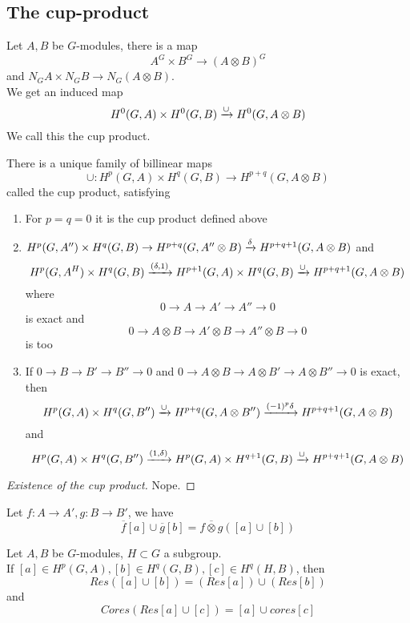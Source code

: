 \documentclass[../main.tex]{subfiles}
\begin{document}
\subsection{The cup-product}
Let $A,B$ be $G$-modules, there is a map
\[ 
A^{G}\times B^{G}\to ( A\otimes B) ^{G}
\]
and $N_G A\times N_G B\to N_G( A\otimes B) $.\\
We get an induced map 
\[ 
	H^{0}( G,A) \times H^{0}( G,B) \xrightarrow{\cup} H^{0}( G,A\otimes B) 
\]
We call this the cup product.
\begin{defn}
	There is a unique family of billinear maps 
	\[ 
	\cup:H^{p}( G,A) \times H^{q}( G,B) \to H^{p+q}( G,A\otimes B) 
	\]
called the cup product, satisfying
\begin{enumerate}
\item For $p=q=0$ it is the cup product defined above
\item $H^{p}( G,A'') \times H^{q}( G,B) \to H^{p+q}( G, A''\otimes B) \xrightarrow{\delta} H^{p+q+1}( G,A\otimes B) $ and
	\[ 
		H^{p}( G,A^{H}) \times H^{q}( G,B) \xrightarrow{( \delta,1) } H^{p+1}( G,A) \times H^{q}( G,B) \xrightarrow{\cup} H^{p+q+1}( G,A\otimes B) 	
	\]
	where 
	\[ 
	0\to A \to A' \to A'' \to 0	
	\]
	is exact and
	\[ 
	0 \to A\otimes B \to A'\otimes B \to A''\otimes B \to 0
	\]
	is too

\item If $0 \to B \to B' \to B''\to 0$ and $0 \to A\otimes B \to A\otimes B' \to A \otimes B'' \to 0$ is exact, then
	\[ 
		H^{p}( G,A) \times H^{q}( G,B'') \xrightarrow{\cup} H^{p+q}( G, A \otimes B'') \xrightarrow{ ( -1)^{p}\delta} H^{p+q+1}( G,A\otimes B) 
	\]
	and
	\[ 
		H^{p}( G,A) \times H^{q}( G,B'') \xrightarrow{( 1,\delta) } H^{p }( G,A) \times H^{q+1}( G, B) \xrightarrow{\cup} H^{p+q+1}( G,A\otimes B) 
	\]
\end{enumerate}
\end{defn}
\begin{proof}[Existence of the cup product]
Nope.
\end{proof}
\begin{thm}
	Let $f:A\to A', g:B\to B'$, we have
	\[ 
		\overline{f}[a] \cup \overline{g}[b] = \overline{f\otimes g}( [ a] \cup [ b] ) 
	\]
	
\end{thm}
\begin{thm}
Let $A,B$ be $G$-modules, $H \subset G$ a subgroup.\\
If $[a] \in H^{p}( G,A) , [ b] \in H^{q}( G,B) , [ c] \in H^{q}( H,B) $, then
\[ 
Res(  [ a] \cup [ b]) = ( Res [ a] ) \cup ( Res [ b] ) 
\]
and
\[ 
Cores(  Res [ a] \cup [ c] ) = [ a] \cup cores [ c] 
\]

\end{thm}
\end{document}
